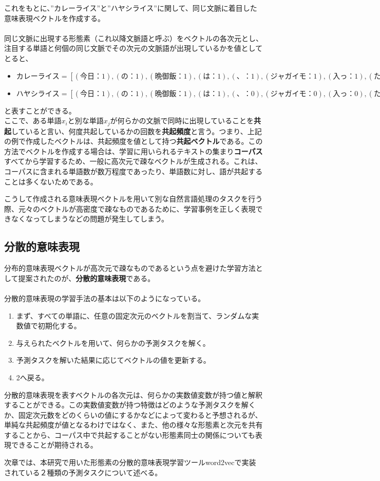 これをもとに、”カレーライス”と”ハヤシライス”に関して、同じ文脈に着目した意味表現ベクトルを作成する。\\
\\
同じ文脈に出現する形態素（これ以降文脈語と呼ぶ）をベクトルの各次元とし、注目する単語と何個の同じ文脈でその次元の文脈語が出現しているかを値としてとると、
\begin{itemize}
  \label{weight_equation}
  \item $カレーライス = [(今日：1),(の：1),(晩御飯：1),(は：1),(、：1),(ジャガイモ：1),(入っ：1),(た：1),(だ：1),(。：1)]$
  \item $ハヤシライス = [(今日：1),(の：1),(晩御飯：1),(は：1),(、：0),(ジャガイモ：0),(入っ：0),(た：0),(だ：1),(。：1)]$
\end{itemize}
と表すことができる。\\

ここで、ある単語$x_i$と別な単語$x_j$が何らかの文脈で同時に出現していることを\textbf{共起}していると言い、何度共起しているかの回数を\textbf{共起頻度}と言う。つまり、上記の例で作成したベクトルは、共起頻度を値として持つ\textbf{共起ベクトル}である。\cite{book_wm}この方法でベクトルを作成する場合は、学習に用いられるテキストの集まり\textbf{コーパス}すべてから学習するため、一般に高次元で疎なベクトルが生成される。これは、コーパスに含まれる単語数が数万程度であったり、単語数に対し、語が共起することは多くないためである。

こうして作成される意味表現ベクトルを用いて別な自然言語処理のタスクを行う際、元々のベクトルが高密度で疎なものであるために、学習事例を正しく表現できなくなってしまうなどの問題が発生してしまう。

\subsection{分散的意味表現}
分布的意味表現ベクトルが高次元で疎なものであるという点を避けた学習方法として提案されたのが、\textbf{分散的意味表現}である。\\
\\
分散的意味表現の学習手法の基本は以下のようになっている。\\
\begin{enumerate}
  \item まず、すべての単語に、任意の固定次元のベクトルを割当て、ランダムな実数値で初期化する。
  \item 与えられたベクトルを用いて、何らかの予測タスクを解く。
  \item 予測タスクを解いた結果に応じてベクトルの値を更新する。
  \item 2へ戻る。
\end{enumerate}

分散的意味表現を表すベクトルの各次元は、何らかの実数値変数が持つ値と解釈することができる。この実数値変数が持つ特徴はどのような予測タスクを解くか、固定次元数をどのくらいの値にするかなどによって変わると予想されるが、単純な共起頻度が値となるわけではなく、また、他の様々な形態素と次元を共有することから、コーパス中で共起することがない形態素同士の関係についても表現できることが期待される。

次章では、本研究で用いた形態素の分散的意味表現学習ツールword2vecで実装されている２種類の予測タスクについて述べる。
